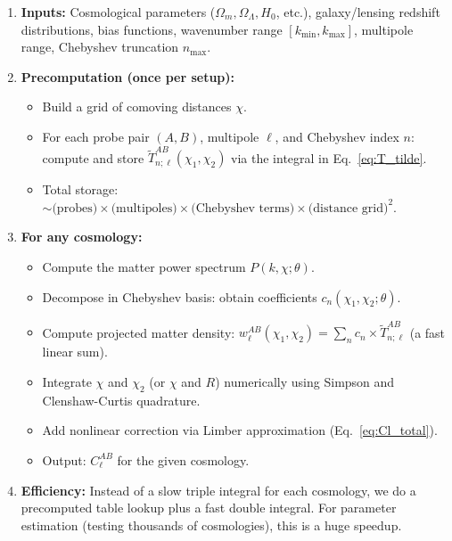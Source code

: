 \begin{enumerate}[leftmargin=2cm]
    \item \textbf{Inputs:} Cosmological parameters ($\Omega_m, \Omega_\Lambda, H_0$, etc.), galaxy/lensing redshift distributions, bias functions, wavenumber range $[k_{\min}, k_{\max}]$, multipole range, Chebyshev truncation $n_{\max}$.

    \item \textbf{Precomputation (once per setup):}
    \begin{itemize}
        \item Build a grid of comoving distances $\chi$.
        \item For each probe pair $(A,B)$, multipole $\ell$, and Chebyshev index $n$: compute and store $\tilde{T}^{AB}_{n;\ell}(\chi_1,\chi_2)$ via the integral in Eq.~\eqref{eq:T_tilde}.
        \item Total storage: $\sim \text{(probes)} \times \text{(multipoles)} \times \text{(Chebyshev terms)} \times \text{(distance grid)}^2$.
    \end{itemize}

    \item \textbf{For any cosmology:}
    \begin{itemize}
        \item Compute the matter power spectrum $P(k, \chi; \theta)$.
        \item Decompose in Chebyshev basis: obtain coefficients $c_n(\chi_1, \chi_2; \theta)$.
        \item Compute projected matter density: $w^{AB}_\ell(\chi_1, \chi_2) = \sum_n c_n \times \tilde{T}^{AB}_{n;\ell}$ (a fast linear sum).
        \item Integrate $\chi$ and $\chi_2$ (or $\chi$ and $R$) numerically using Simpson and Clenshaw-Curtis quadrature.
        \item Add nonlinear correction via Limber approximation (Eq.~\eqref{eq:Cl_total}).
        \item Output: $C_\ell^{AB}$ for the given cosmology.
    \end{itemize}

    \item \textbf{Efficiency:} Instead of a slow triple integral for each cosmology, we do a precomputed table lookup plus a fast double integral. For parameter estimation (testing thousands of cosmologies), this is a huge speedup.
\end{enumerate}

